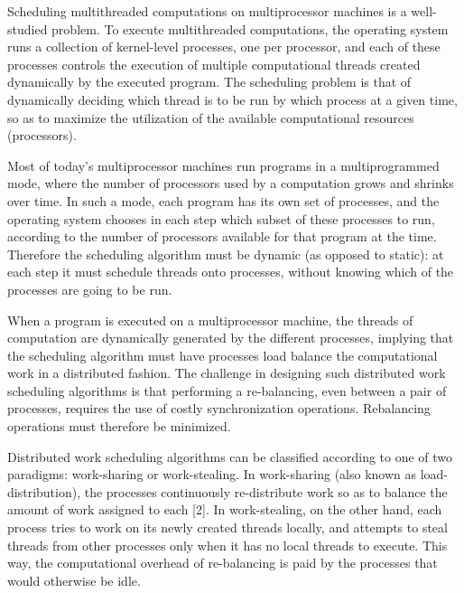 Scheduling multithreaded computations on multiprocessor machines is a
well-studied problem. To execute multithreaded computations, the
operating system runs a collection of kernel-level processes, one per
processor, and each of these processes controls the execution of
multiple computational threads created dynamically by the executed
program. The scheduling problem is that of dynamically deciding which
thread is to be run by which process at a given time, so as to
maximize the utilization of the available computational resources
(processors).

Most of today's multiprocessor machines run programs in a
multiprogrammed mode, where the number of processors used by a
computation grows and shrinks over time. In such a mode, each program
has its own set of processes, and the operating system chooses in each
step which subset of these processes to run, according to the number
of processors available for that program at the time. Therefore the
scheduling algorithm must be dynamic (as opposed to static): at each
step it must schedule threads onto processes, without knowing which of
the processes are going to be run.

When a program is executed on a multiprocessor machine, the threads
of computation are dynamically generated by the different processes,
implying that the scheduling algorithm must have processes load
balance the computational work in a distributed fashion. The
challenge in designing such distributed work scheduling algorithms
is that performing a re-balancing, even between a pair of processes,
requires the use of costly synchronization operations. Rebalancing
operations must therefore be minimized.

Distributed work scheduling algorithms can be classified according to
one of two paradigms: work-sharing or work-stealing. In work-sharing
(also known as load-distribution), the processes continuously
re-distribute work so as to balance the amount of work assigned to
each [2]. In work-stealing, on the other hand, each process tries to
work on its newly created threads locally, and attempts to steal
threads from other processes only when it has no local threads to
execute. This way, the computational overhead of re-balancing is paid
by the processes that would otherwise be idle.

